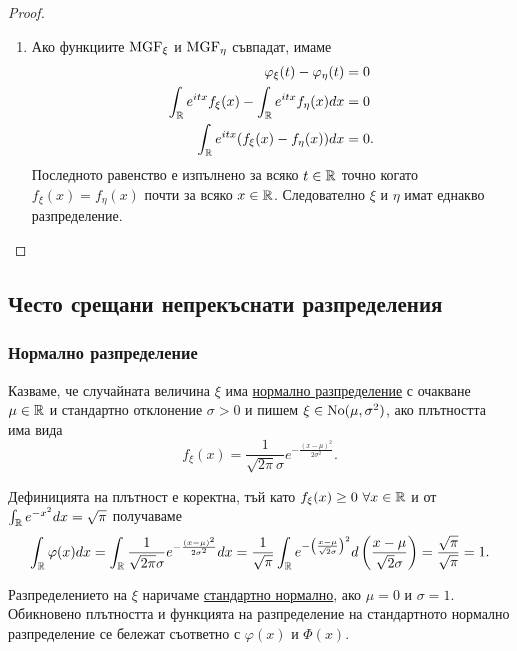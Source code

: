 \documentclass[numbers=endperiod, DIV=15, bibliography=totocnumbered]{scrartcl}
\begin{document}
\begin{proof}
\begin{enumerate}
    \item Ако функциите $\operatorname{MGF}_\xi$ и $\operatorname{MGF}_\eta$ съвпадат, имаме
    \begin{align*}
      \varphi_\xi(t) - \varphi_\eta(t) &= 0
      \\
      \int_{\mathbb{R}} e^{itx} f_\xi(x) - \int_{\mathbb{R}} e^{itx} f_\eta(x) dx &= 0
      \\
      \int_{\mathbb{R}} e^{itx} (f_\xi(x) - f_\eta(x)) dx &= 0.
    \end{align*}
    Последното равенство е изпълнено за всяко $t \in \mathbb{R}$ точно когато $f_\xi(x) = f_\eta(x)$ почти за всяко $x \in \mathbb{R}$. Следователно $\xi$ и $\eta$ имат еднакво разпределение.
  \end{enumerate}
\end{proof}

\subsection{Често срещани непрекъснати разпределения}

\subsubsection{Нормално разпределение}\label{dist:normal}

\begin{definition}
  Казваме, че случайната величина $\xi$ има \uline{нормално разпределение} с очакване $\mu \in \mathbb{R}$ и стандартно отклонение $\sigma > 0$ и пишем $\xi \in \operatorname{No}(\mu, \sigma^2)$, ако плътността има вида
  \begin{displaymath}
    f_\xi(x) = \frac 1 {\sqrt{2\pi} \sigma} e^{-\frac{{(x-\mu)}^2} {2\sigma^2}}.
  \end{displaymath}

  Дефиницията на плътност е коректна, тъй като $f_\xi(x) \geq 0~\forall x \in \mathbb{R}$ и от $\int_{\mathbb{R}} e^{-x^2} dx = \sqrt \pi$ получаваме
  \begin{displaymath}
    \int_{\mathbb{R}} \varphi(x) dx
    =
    \int_{\mathbb{R}} \frac 1 {\sqrt{2\pi} \sigma} e^{-\frac{{(x-\mu)}^2} {2\sigma^2}} dx
    =
    \frac 1 {\sqrt{\pi}} \int_{\mathbb{R}} e^{-{\left(\frac {x-\mu} {\sqrt 2 \sigma} \right)}^2} d\left(\frac {x-\mu} {\sqrt 2 \sigma} \right)
    =
    \frac {\sqrt{\pi}} {\sqrt{\pi}}
    =
    1.
  \end{displaymath}

  Разпределението на $\xi$ наричаме \uline{стандартно нормално}, ако $\mu = 0$ и $\sigma = 1$. Обикновено плътността и функцията на разпределение на стандартното нормално разпределение се бележат съответно с $\varphi(x)$ и $\Phi(x)$.
\end{definition}
\end{document}
